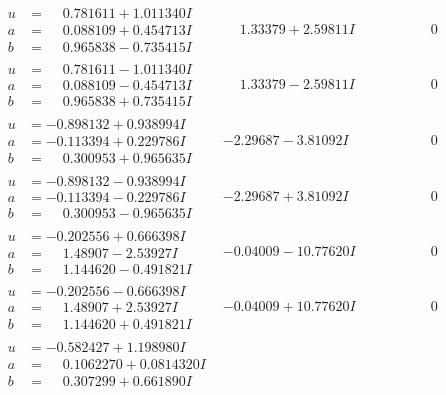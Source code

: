 \documentclass[1p]{elsarticle_modified}
\theoremstyle{definition}
\begin{document}
$$\begin{array}{c|c|c}
\begin{aligned}
u &= \phantom{-}0.781611 + 1.011340 I \\
a &= \phantom{-}0.088109 + 0.454713 I \\
b &= \phantom{-}0.965838 - 0.735415 I\end{aligned}
 & \phantom{-}1.33379 + 2.59811 I & \phantom{-0.000000 } 0 \\ \hline\begin{aligned}
u &= \phantom{-}0.781611 - 1.011340 I \\
a &= \phantom{-}0.088109 - 0.454713 I \\
b &= \phantom{-}0.965838 + 0.735415 I\end{aligned}
 & \phantom{-}1.33379 - 2.59811 I & \phantom{-0.000000 } 0 \\ \hline\begin{aligned}
u &= -0.898132 + 0.938994 I \\
a &= -0.113394 + 0.229786 I \\
b &= \phantom{-}0.300953 + 0.965635 I\end{aligned}
 & -2.29687 - 3.81092 I & \phantom{-0.000000 } 0 \\ \hline\begin{aligned}
u &= -0.898132 - 0.938994 I \\
a &= -0.113394 - 0.229786 I \\
b &= \phantom{-}0.300953 - 0.965635 I\end{aligned}
 & -2.29687 + 3.81092 I & \phantom{-0.000000 } 0 \\ \hline\begin{aligned}
u &= -0.202556 + 0.666398 I \\
a &= \phantom{-}1.48907 - 2.53927 I \\
b &= \phantom{-}1.144620 - 0.491821 I\end{aligned}
 & -0.04009 - 10.77620 I & \phantom{-0.000000 } 0 \\ \hline\begin{aligned}
u &= -0.202556 - 0.666398 I \\
a &= \phantom{-}1.48907 + 2.53927 I \\
b &= \phantom{-}1.144620 + 0.491821 I\end{aligned}
 & -0.04009 + 10.77620 I & \phantom{-0.000000 } 0 \\ \hline\begin{aligned}
u &= -0.582427 + 1.198980 I \\
a &= \phantom{-}0.1062270 + 0.0814320 I \\
b &= \phantom{-}0.307299 + 0.661890 I\end{aligned}

\end{array}$$
\end{document}
